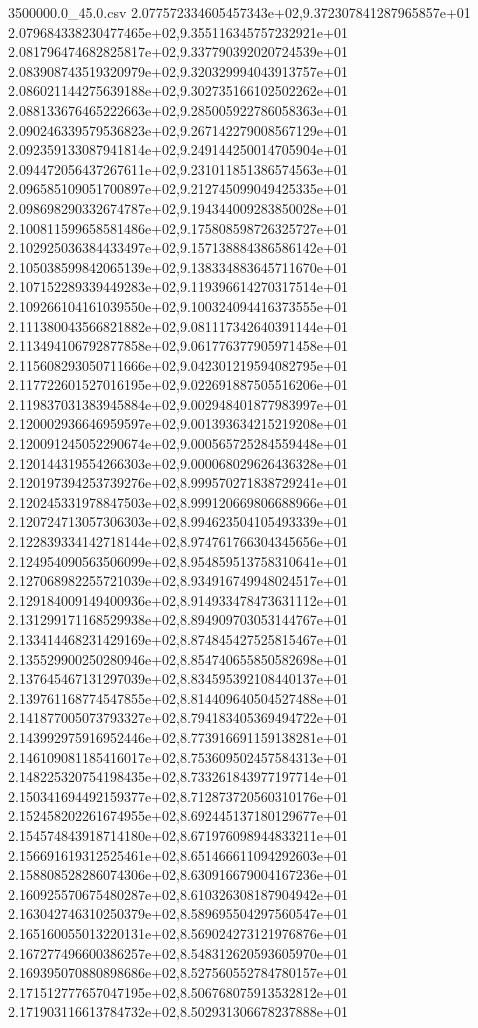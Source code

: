 \begin{filecontents*}{3500000.0_45.0.csv}
2.077572334605457343e+02,9.372307841287965857e+01
2.079684338230477465e+02,9.355116345757232921e+01
2.081796474682825817e+02,9.337790392020724539e+01
2.083908743519320979e+02,9.320329994043913757e+01
2.086021144275639188e+02,9.302735166102502262e+01
2.088133676465222663e+02,9.285005922786058363e+01
2.090246339579536823e+02,9.267142279008567129e+01
2.092359133087941814e+02,9.249144250014705904e+01
2.094472056437267611e+02,9.231011851386574563e+01
2.096585109051700897e+02,9.212745099049425335e+01
2.098698290332674787e+02,9.194344009283850028e+01
2.100811599658581486e+02,9.175808598726325727e+01
2.102925036384433497e+02,9.157138884386586142e+01
2.105038599842065139e+02,9.138334883645711670e+01
2.107152289339449283e+02,9.119396614270317514e+01
2.109266104161039550e+02,9.100324094416373555e+01
2.111380043566821882e+02,9.081117342640391144e+01
2.113494106792877858e+02,9.061776377905971458e+01
2.115608293050711666e+02,9.042301219594082795e+01
2.117722601527016195e+02,9.022691887505516206e+01
2.119837031383945884e+02,9.002948401877983997e+01
2.120002936646959597e+02,9.001393634215219208e+01
2.120091245052290674e+02,9.000565725284559448e+01
2.120144319554266303e+02,9.000068029626436328e+01
2.120197394253739276e+02,8.999570271838729241e+01
2.120245331978847503e+02,8.999120669806688966e+01
2.120724713057306303e+02,8.994623504105493339e+01
2.122839334142718144e+02,8.974761766304345656e+01
2.124954090563506099e+02,8.954859513758310641e+01
2.127068982255721039e+02,8.934916749948024517e+01
2.129184009149400936e+02,8.914933478473631112e+01
2.131299171168529938e+02,8.894909703053144767e+01
2.133414468231429169e+02,8.874845427525815467e+01
2.135529900250280946e+02,8.854740655850582698e+01
2.137645467131297039e+02,8.834595392108440137e+01
2.139761168774547855e+02,8.814409640504527488e+01
2.141877005073793327e+02,8.794183405369494722e+01
2.143992975916952446e+02,8.773916691159138281e+01
2.146109081185416017e+02,8.753609502457584313e+01
2.148225320754198435e+02,8.733261843977197714e+01
2.150341694492159377e+02,8.712873720560310176e+01
2.152458202261674955e+02,8.692445137180129677e+01
2.154574843918714180e+02,8.671976098944833211e+01
2.156691619312525461e+02,8.651466611094292603e+01
2.158808528286074306e+02,8.630916679004167236e+01
2.160925570675480287e+02,8.610326308187904942e+01
2.163042746310250379e+02,8.589695504297560547e+01
2.165160055013220131e+02,8.569024273121976876e+01
2.167277496600386257e+02,8.548312620593605970e+01
2.169395070880898686e+02,8.527560552784780157e+01
2.171512777657047195e+02,8.506768075913532812e+01
2.171903116613784732e+02,8.502931306678237888e+01

\end{filecontents*}
